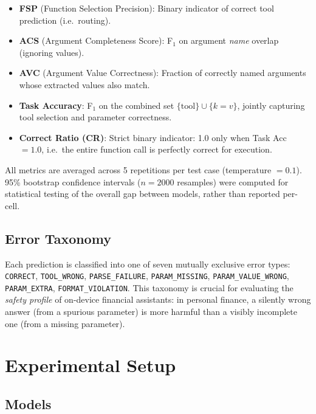 \documentclass[11pt,twocolumn]{article}
\begin{document}
\begin{itemize}
    \item \textbf{FSP} (Function Selection Precision): Binary
          indicator of correct tool prediction (i.e.\ routing).
    \item \textbf{ACS} (Argument Completeness Score): F$_1$ on
          argument \emph{name} overlap (ignoring values).
    \item \textbf{AVC} (Argument Value Correctness): Fraction of
          correctly named arguments whose extracted values also match.
    \item \textbf{Task Accuracy}: F$_1$ on the combined set
          $\{\text{tool}\} \cup \{k{=}v\}$, jointly capturing tool
          selection and parameter correctness.
    \item \textbf{Correct Ratio (CR)}: Strict binary indicator: 1.0
          only when Task Acc $= 1.0$, i.e.\ the entire function call
          is perfectly correct for execution.
\end{itemize}

All metrics are averaged across 5 repetitions per test case
(temperature $= 0.1$). 95\% bootstrap confidence intervals
\citep{efron1979bootstrap} ($n=2000$ resamples) were computed
for statistical testing of the overall gap between models,
rather than reported per-cell.

\subsection{Error Taxonomy}

Each prediction is classified into one of seven mutually exclusive
error types: \texttt{CORRECT}, \texttt{TOOL\_WRONG},
\texttt{PARSE\_FAILURE}, \texttt{PARAM\_MISSING},
\texttt{PARAM\_VALUE\_WRONG}, \texttt{PARAM\_EXTRA},
\texttt{FORMAT\_VIOLATION}.
This taxonomy is crucial for evaluating the \emph{safety profile}
of on-device financial assistants: in personal finance, a
silently wrong answer (from a spurious parameter) is more
harmful than a visibly incomplete one (from a missing parameter).

\section{Experimental Setup}

\subsection{Models}
\end{document}
